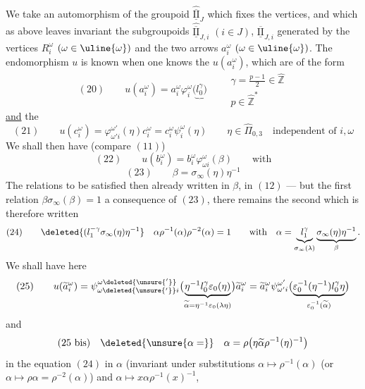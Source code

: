 We take an automorphism  of the groupoid $\widehat{\overline{\underline{\mathrm{II}}}}_J$ which  fixes the vertices, and which as above leaves invariant the subgroupoids $\widehat{\overline{\underline{\mathrm{II}}}}_{J,i}$ $(i\in J)$,  $\overline{\underline{\mathrm{II}}}_{J,i}$ generated by the  vertices $R_i^\omega$ $(\omega\in\uline{\omega})$ and the two arrows $a_i^\omega$ $(\omega\in\uline{\omega})$.
 The endomorphism $u$ is known when one knows the $u(a_i^\omega)$, which are of the form
\[
(20)\qquad u(a_i^\omega)=a_i^\omega\varphi_i^\omega\bigl(\underbrace{l_0^\gamma}\bigr)
\qquad\begin{array}{l}\gamma=\frac{p-1}{2}\in\widehat{\mathbb Z}\\p\in\widehat{\mathbb Z}^{*}\end{array}
\]
\uline{and} the
\[
(21)\qquad u(c_i^\omega)=\varphi_{\omega'i}^{\omega'}(\eta)c_i^\omega=c_i^\omega\psi_i^\omega(\eta)
\qquad\eta\in\widehat\Pi_{0,3}\quad\text{independent of }i,\omega
\]
We shall then have (compare $(11)$)
\[
(22)\qquad u(b_i^\omega)=b_i^\omega\varphi_{\omega i}^\omega(\beta)\qquad\text{with}
\]
\[
(23)\qquad\beta=\sigma_\infty(\eta)\eta^{-1}
\]
The relations to be satisfied  then already written in  $\beta$,  in $(12)$ --- but the first relation $\beta\sigma_\infty(\beta)=1$ a consequence of $(23)$, there remains the second which is therefore written
\[
(24)\qquad\deleted{(l_1^{-\gamma}\sigma_\infty(\eta)\eta^{-1}}
\quad\alpha\rho^{-1}(\alpha)\rho^{-2}(\alpha)=1
\qquad\text{with}\quad\alpha=\underbrace{l_1^\gamma}_{\sigma_\infty(\lambda)}\underbrace{\sigma_\infty(\eta)\eta^{-1}}_\beta.
\]
We shall have here
\[
(25)\qquad
u(\widetilde a_i^\omega)=\psi_{\omega\deleted{\unsure{'}}i}^{\omega\deleted{\unsure{'}}}\bigl(\underbrace{\eta^{-1}l_0^\gamma\varepsilon_0(\eta)}_{\widetilde\alpha=\eta^{-1}\varepsilon_0(\lambda\eta)}\bigr)\widetilde a_i^\omega
=\widetilde a_i^\omega\psi_{\omega'i}^{\omega'}\bigl(\underbrace{\varepsilon_0^{-1}(\eta^{-1})l_0^\gamma\eta}_{\varepsilon_0^{-1}(\widetilde\alpha)}\bigr)
\]
and
\[
(25\text{ bis})\quad\deleted{\unsure{\alpha=}}\quad\alpha=\rho\bigl(\eta\widetilde\alpha\rho^{-1}(\eta)^{-1}\bigr)
\]
 in the equation $(24)$ in $\alpha$ (invariant under substitutions $\alpha\mapsto\rho^{-1}(\alpha)$ (or $\alpha\mapsto\rho\alpha=\rho^{-2}(\alpha)$) and $\alpha\mapsto x\alpha\rho^{-1}(x)^{-1}$,
